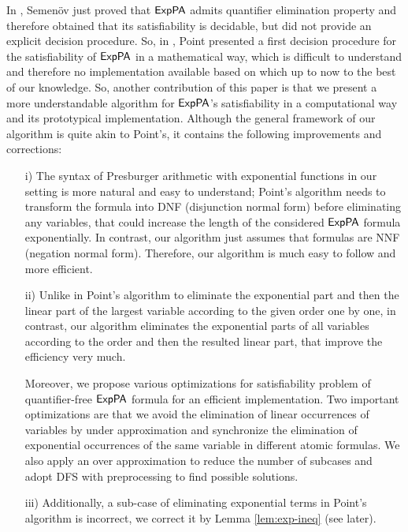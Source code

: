 In \cite{Semenov84}, Semen\"{o}v just proved that ${\sf ExpPA}$ admits quantifier elimination property and 
therefore obtained that its satisfiability is decidable, but  did not provide an explicit decision procedure. So, in  \cite{Point86}, Point presented a first decision procedure for the satisfiability of ${\sf ExpPA}$ in a mathematical way, which is difficult to understand and therefore no implementation available based on which up to now to the best of our knowledge. So, another contribution of this paper is that we present a more understandable algorithm for ${\sf ExpPA}$'s satisfiability in a computational way and its prototypical implementation. Although the general framework of our algorithm is quite akin to Point's,  it contains the following improvements and corrections: 
\begin{itemize}
	\item[i)] The syntax of Presburger arithmetic with exponential functions in our setting is more natural and easy to understand; Point's algorithm needs to transform the formula into DNF (disjunction normal form) before  eliminating any variables, that could increase the length of the considered ${\sf ExpPA}$ formula exponentially. In contrast, our algorithm just assumes that formulas are NNF (negation normal form). Therefore, our algorithm is much easy to follow and more efficient.
\item[ii)] Unlike in Point's algorithm to eliminate the exponential part and then the linear part of the largest variable according to the given order one by one, in contrast, our algorithm eliminates the exponential parts of 
	all variables according to the order and then the resulted linear part, that improve the efficiency very much.
	
Moreover, we propose various optimizations for satisfiability problem of quantifier-free ${\sf ExpPA}$ formula for an efficient implementation. Two important optimizations are that we avoid the elimination of linear occurrences of variables by under approximation and synchronize the elimination of exponential occurrences of the same variable in different atomic formulas. We also apply an over approximation to reduce the number of subcases and adopt DFS with preprocessing to find possible solutions. 

\item[iii)] Additionally, a sub-case of eliminating exponential terms in Point's algorithm is incorrect, we correct it by Lemma \ref{lem:exp-ineq} (see later).
\end{itemize}
 

